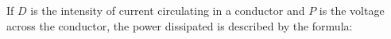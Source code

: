 If $D$ is the intensity of current circulating in a conductor 
and $P$ is the voltage across the conductor,
the power dissipated is described by the formula: %